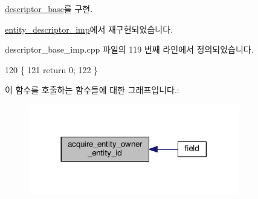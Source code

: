 \hyperlink{classavdecc__lib_1_1descriptor__base_a6480d803970d505ce7a9b429a6eb71bd}{descriptor\+\_\+base}를 구현.



\hyperlink{classavdecc__lib_1_1entity__descriptor__imp_a507b250a984bb5611d2699cd26d60a51}{entity\+\_\+descriptor\+\_\+imp}에서 재구현되었습니다.



descriptor\+\_\+base\+\_\+imp.\+cpp 파일의 119 번째 라인에서 정의되었습니다.


\begin{DoxyCode}
120 \{
121     \textcolor{keywordflow}{return} 0;
122 \}
\end{DoxyCode}


이 함수를 호출하는 함수들에 대한 그래프입니다.\+:
\nopagebreak
\begin{figure}[H]
\begin{center}
\leavevmode
\includegraphics[width=260pt]{classavdecc__lib_1_1descriptor__base__imp_a507b250a984bb5611d2699cd26d60a51_icgraph}
\end{center}
\end{figure}


